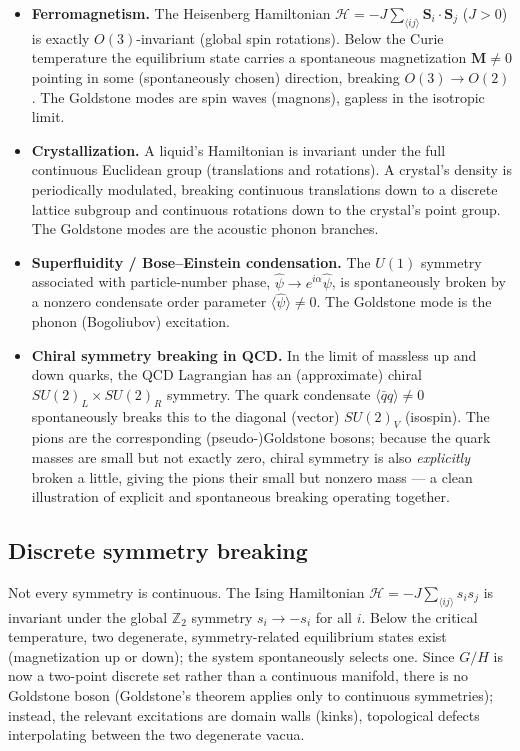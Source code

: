\begin{itemize}
\item \textbf{Ferromagnetism.} The Heisenberg Hamiltonian $\mathcal{H} =
    -J\sum_{\langle ij\rangle}\bm S_i\!\cdot\!\bm S_j$ ($J>0$) is exactly
        $O(3)$-invariant (global spin rotations). Below the Curie temperature
        the equilibrium state carries a spontaneous magnetization $\bm M\neq0$
        pointing in some (spontaneously chosen) direction, breaking $O(3)\to
        O(2)$. The Goldstone modes are spin waves (magnons), gapless in the
        isotropic limit.

\item \textbf{Crystallization.} A liquid's Hamiltonian is invariant under the
    full continuous Euclidean group (translations and rotations). A crystal's
        density is periodically modulated, breaking continuous translations
        down to a discrete lattice subgroup and continuous rotations down to
        the crystal's point group. The Goldstone modes are the acoustic phonon
        branches.

\item \textbf{Superfluidity / Bose--Einstein condensation.} The $U(1)$ symmetry
    associated with particle-number phase, $\hat\psi \to
        e^{i\alpha}\hat\psi$, is spontaneously broken by a nonzero condensate
        order parameter $\langle\hat\psi\rangle\neq0$. The Goldstone mode is
        the phonon (Bogoliubov) excitation.

\item \textbf{Chiral symmetry breaking in QCD.} In the limit of massless up and
    down quarks, the QCD Lagrangian has an (approximate) chiral $SU(2)_L\times
        SU(2)_R$ symmetry. The quark condensate $\langle\bar q q\rangle\neq0$
        spontaneously breaks this to the diagonal (vector) $SU(2)_V$ (isospin).
        The pions are the corresponding (pseudo-)Goldstone bosons; because the
        quark masses are small but not exactly zero, chiral symmetry is also
        \emph{explicitly} broken a little, giving the pions their small but
        nonzero mass — a clean illustration of explicit and spontaneous
        breaking operating together.
\end{itemize}

\subsection{Discrete symmetry breaking}

Not every symmetry is continuous. The Ising Hamiltonian $\mathcal{H}=-J\sum_{\langle
ij\rangle}s_is_j$ is invariant under the global $\mathbb Z_2$ symmetry $s_i\to
-s_i$ for all $i$. Below the critical temperature, two degenerate,
symmetry-related equilibrium states exist (magnetization up or down); the
system spontaneously selects one. Since $G/H$ is now a two-point discrete set
rather than a continuous manifold, there is no Goldstone boson (Goldstone's
theorem applies only to continuous symmetries); instead, the relevant
excitations are domain walls (kinks), topological defects interpolating between
the two degenerate vacua.

